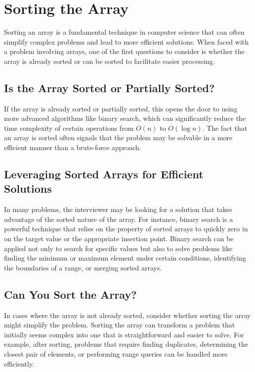 \section{Sorting the Array}
\label{sec:Sorting_the_Array}

Sorting an array is a fundamental technique in computer science that can often simplify complex problems and lead to more efficient solutions. When faced with a problem involving arrays, one of the first questions to consider is whether the array is already sorted or can be sorted to facilitate easier processing.

\subsection*{Is the Array Sorted or Partially Sorted?}

If the array is already sorted or partially sorted, this opens the door to using more advanced algorithms like binary search, which can significantly reduce the time complexity of certain operations from \(O(n)\) to \(O(\log n)\). The fact that an array is sorted often signals that the problem may be solvable in a more efficient manner than a brute-force approach.

\subsection*{Leveraging Sorted Arrays for Efficient Solutions}

In many problems, the interviewer may be looking for a solution that takes advantage of the sorted nature of the array. For instance, binary search is a powerful technique that relies on the property of sorted arrays to quickly zero in on the target value or the appropriate insertion point. Binary search can be applied not only to search for specific values but also to solve problems like finding the minimum or maximum element under certain conditions, identifying the boundaries of a range, or merging sorted arrays.

\subsection*{Can You Sort the Array?}

In cases where the array is not already sorted, consider whether sorting the array might simplify the problem. Sorting the array can transform a problem that initially seems complex into one that is straightforward and easier to solve. For example, after sorting, problems that require finding duplicates, determining the closest pair of elements, or performing range queries can be handled more efficiently. 

